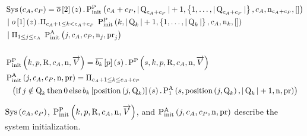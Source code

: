 \begin{align*}
&\operatorname{Sys}\left(c_A, c_P\right) = \overline{o}\left[2\right]\left(z\right) . \textstyle\operatorname{P^{P}_{init}}\left(
    c_A + c_P,
    |\operatorname{Q}_{c_A + c_P}| + 1,
    \left\{1,\ldots,|\operatorname{Q}_{c_A + c_P}|\right\},
    c_A,
    \operatorname{n}_{c_A + c_P},
    \mathtt{[]}
\right)\\
&\; | \; o\left[1\right]\left(z\right) .
    \Pi_{c_A + 1 \leq k < c_A + c_P}\; \textstyle\operatorname{P^{P}_{init}}\left(
        k,
        |\operatorname{Q}_{k}| + 1,
        \left\{1,\ldots,|\operatorname{Q}_{k}|\right\},
        c_A,
        \operatorname{n}_{k},
        \mathtt{[]}
    \right)\\
&\; | \; \Pi_{1 \leq j \leq c_A}\; \operatorname{P^{A}_{init}}\left(
    j,
    c_A,
    c_P,
    \operatorname{n}_{j},
    \operatorname{pr}_{j}
\right)\\\\
&\textstyle\operatorname{P^{P}_{init}}\left(
    k,
    p,
    \operatorname{R},
    c_A,
    \operatorname{n},
    \overrightarrow{V}
\right) = \overline{b_{k}}\left[p\right]\left(s\right) .
    \operatorname{P^{P}_{}}\left(
        s,
        k,
        p,
        \operatorname{R},
        c_A,
        \operatorname{n},
        \overrightarrow{V}
    \right)\\
&\operatorname{P^{A}_{init}}\left(
    j,
    c_A,
    c_P,
    \operatorname{n},
    \operatorname{pr}
\right) = \Pi_{c_A + 1 \leq k \leq c_A + c_P}\;\\
&\hspace*{0.75em * 1}\left(
    \operatorname{if} j\notin\operatorname{Q}_{k}
    \operatorname{then} 0
    \operatorname{else} b_{k}\left[\operatorname{position}\left(j, \operatorname{Q}_{k}\right)\right]\left(s\right) . \operatorname{P^{A}_{1}}\left(
        s,
        \operatorname{position}\left(j, \operatorname{Q}_{k}\right),
        |\operatorname{Q}_{k}| + 1,
        \operatorname{n},
        \operatorname{pr}
    \right)\right)
\end{align*}

$\operatorname{Sys}\left(c_A, c_P\right)$, $\textstyle\operatorname{P^{P}_{init}}\left(
    k,
    p,
    \operatorname{R},
    c_A,
    \operatorname{n},
    \overrightarrow{V}
\right)$, and $\operatorname{P^{A}_{init}}\left(
    j,
    c_A,
    c_P,
    \operatorname{n},
    \operatorname{pr}
\right)$ describe the system initialization.

